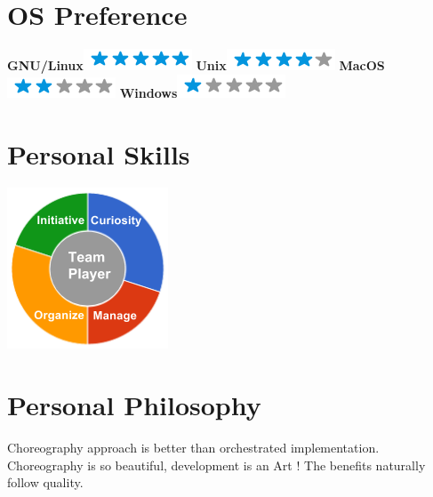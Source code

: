 \documentclass[]{friggeri-cv}
\begin{document}
\begin{aside}
  \section{OS Preference}
    \textbf{GNU/Linux}\includegraphics[scale=0.40]{img/5stars.png}
    \textbf{Unix}\includegraphics[scale=0.40]{img/4stars.png}
    \textbf{MacOS}\includegraphics[scale=0.40]{img/2stars.png}
    \textbf{Windows}\includegraphics[scale=0.40]{img/1stars.png}
    ~
  \section{Personal Skills}
    \includegraphics[scale=0.62]{img/personal.png}
    ~
\end{aside}

\section{Personal Philosophy}
    Choreography approach is better than orchestrated implementation.
    Choreography is so beautiful, development is an Art !
    The benefits naturally follow quality.
\end{document}
